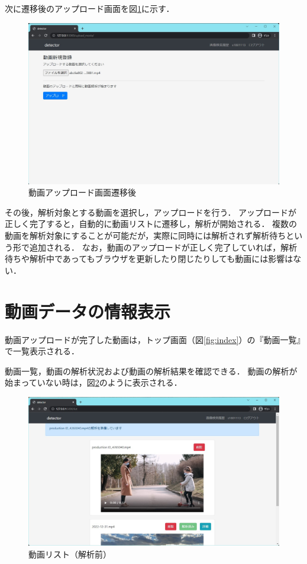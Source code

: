 \documentclass[a4j,12pt,dvipdfmx]{jreport}
\begin{document}
次に遷移後のアップロード画面を図\ref{fig:movie_upload}に示す．

\begin{figure}[H]
  \centering
  \includegraphics[width=13cm]{image/movie_upload.jpg}
  \caption{動画アップロード画面遷移後}
  \label{fig:movie_upload}
\end{figure}

その後，解析対象とする動画を選択し，アップロードを行う．
アップロードが正しく完了すると，自動的に動画リストに遷移し，解析が開始される．
複数の動画を解析対象にすることが可能だが，実際に同時には解析されず解析待ちという形で追加される．
なお，動画のアップロードが正しく完了していれば，解析待ちや解析中であってもブラウザを更新したり閉じたりしても動画には影響はない．

\section{動画データの情報表示}
動画アップロードが完了した動画は，トップ画面（図\ref{fig:index}）の『動画一覧』で一覧表示される．

動画一覧，動画の解析状況および動画の解析結果を確認できる．
動画の解析が始まっていない時は，図\ref{fig:preparation}のように表示される．
\begin{figure}[H]
  \centering
  \includegraphics[width=13cm]{image/preparation.jpg}
  \caption{動画リスト（解析前）}
  \label{fig:preparation}
\end{figure}
\end{document}
